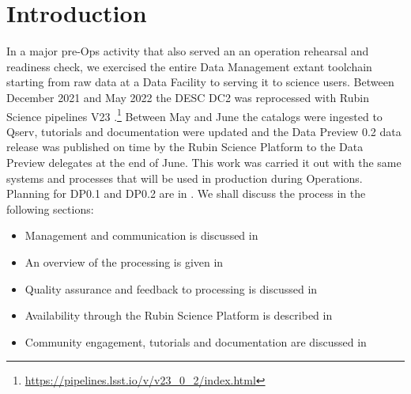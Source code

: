 \section{Introduction}\label{sec:intro}

In a major pre-Ops activity that also served an an operation rehearsal and readiness check, we exercised the entire Data Management extant toolchain starting from raw data at a Data Facility to serving it to science users. Between December 2021 and May 2022 the DESC DC2 \citep{2021ApJS..253...31L} was reprocessed with Rubin Science pipelines V23 .\footnote{\url{https://pipelines.lsst.io/v/v23_0_2/index.html}}
Between May and June the catalogs were ingested to Qserv, tutorials and documentation were updated and the Data Preview 0.2 data release was published on time by the Rubin Science Platform to the Data Preview delegates at the end of June.
This work was carried it out with the same systems and processes that will be used in production during Operations.
Planning for DP0.1 and DP0.2 are in .
We shall discuss the process in the following sections:

\begin{itemize}
\item Management and communication is discussed in 
\item An overview of the processing is given in 
\item Quality assurance and feedback to processing is discussed in  
\item Availability through the Rubin Science Platform is described in 
\item Community engagement, tutorials and documentation are discussed in 
\end{itemize}
